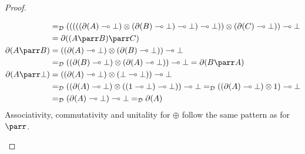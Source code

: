 \documentclass{lmcs}
\newcommand*{\tens}{\otimes} %
\newcommand*{\lolipop}{\multimap} %
\newcommand*{\eqeq}{=} %
\newcommand*{\thD}{\mathcal{D}}
\newcommand*{\isoc}{\eqeq_\thD} %
\newcommand*{\tradc}[1]{\partial(#1)}
\begin{document}
\begin{proof}
\begin{itemize}
{\begin{align*}
  &\isoc (((((\tradc{A} \lolipop \bot) \tens (\tradc{B} \lolipop \bot) \lolipop \bot) \lolipop \bot)) \tens (\tradc{C} \lolipop \bot)) \lolipop \bot\\
  &= \tradc{(A\parr B)\parr C} \\
\tradc{A\parr B}
  &= ((\tradc{A} \lolipop \bot) \tens (\tradc{B} \lolipop \bot)) \lolipop \bot \\
  &\isoc ((\tradc{B} \lolipop \bot) \tens (\tradc{A} \lolipop \bot)) \lolipop \bot = \tradc{B\parr A} \\
\tradc{A\parr \bot}
  &= ((\tradc{A} \lolipop \bot) \tens (\bot \lolipop \bot)) \lolipop \bot\\
  &\isoc ((\tradc{A} \lolipop \bot) \tens ((1\lolipop\bot)\lolipop\bot)) \lolipop \bot \isoc ((\tradc{A} \lolipop \bot) \tens 1) \lolipop \bot \\
  &\isoc (\tradc{A} \lolipop \bot) \lolipop \bot \isoc \tradc{A}
\end{align*}
}
Associativity, commutativity and unitality for $\oplus$ follow the same pattern as for $\parr$.


\end{itemize}
\end{proof}
\end{document}

